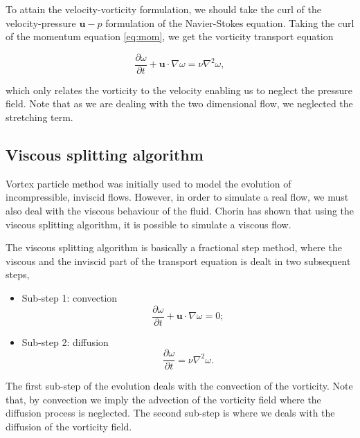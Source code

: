 To attain the velocity-vorticity formulation, we should take the curl of the velocity-pressure $\mathbf{u}-p$ formulation of the Navier-Stokes equation. Taking the curl of the momentum equation \ref{eq:mom}, we get the vorticity transport equation

	\begin{equation}
	\frac{\partial \omega}{\partial t} + \mathbf{u}\cdot\nabla\omega = \nu \nabla^2 \omega,
	\end{equation}

which only relates the vorticity to the velocity enabling us to neglect the pressure field. Note that as we are dealing with the two dimensional flow, we neglected the stretching term. 


\subsection{Viscous splitting algorithm}
Vortex particle method was initially used to model the evolution of incompressible, inviscid flows. However, in order to simulate a real flow, we must also deal with the viscous behaviour of the fluid. Chorin \cite{Chorin1973} has shown that using the viscous splitting algorithm, it is possible to simulate a viscous flow. 

The viscous splitting algorithm is basically a fractional step method, where the viscous and the inviscid part of the transport equation is dealt in two subsequent steps, 

	\begin{itemize}
	\item Sub-step 1: convection
		\begin{equation}
		\frac{\partial\omega}{\partial t} + \mathbf{u}\cdot\nabla\omega=0;
		\label{eq:convectionEulerian}
		\end{equation}
		
	\item Sub-step 2: diffusion
		\begin{equation}
		\frac{\partial\omega}{\partial t} = \nu\nabla^2\omega.
		\label{eq:vsa2}
		\end{equation}
	
	\end{itemize}

The first sub-step of the evolution deals with the convection of the vorticity. Note that, by convection we imply the advection of the vorticity field where the diffusion process is neglected. The second sub-step is where we deals with the diffusion of the vorticity field. 

